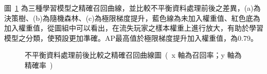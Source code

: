 圖~\ref{fig:eva_PRCurveEvaluationImbalancedData} 為三種學習模型之精確召回曲線，並比較不平衡資料處理前後之差異，(a)為決策樹、(b)為隨機森林、(c)為極限梯度提升，藍色線為未加入權重值、紅色底為加入權重值，從圖組中可以看出，在流失玩家之樣本權重上進行放大，有助於學習模型之分類，使預設更加準確。AP最高值於極限梯度提升加入權重值，為0.79。

\begin{figure}[!htb]
    \centering
    \caption[不平衡資料處理前後比較之精確召回曲線圖]{不平衡資料處理前後比較之精確召回曲線圖\ (\ x 軸為召回率；y 軸為精確率\ )}
    \label{fig:eva_PRCurveEvaluationImbalancedData}
\end{figure}

